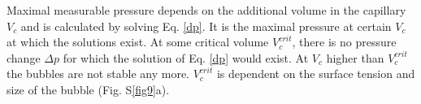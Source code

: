 \documentclass[a4paper,12pt]{article}
\begin{document}
Maximal measurable pressure depends on the additional volume in the capillary $V_c$ and is calculated by solving Eq. \eqref{dp}. It is the maximal pressure at certain $V_c$ at which the solutions exist. At some critical volume $V_c^{crit}$, there is no pressure change $\Delta p$ for which the solution of Eq. \eqref{dp} would exist. At $V_c$ higher than $V_c^{crit}$ the bubbles are not stable any more. $V_c^{crit}$ is dependent on the surface tension and size of the bubble (Fig. S\ref{fig9}a).


	\clearpage

	
	
	
	
	
\end{document}
